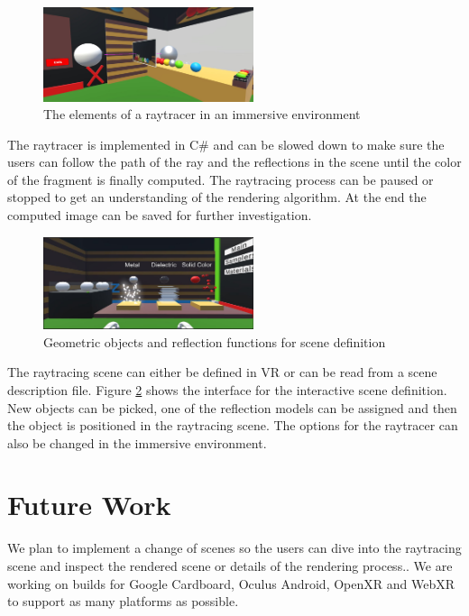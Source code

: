 \documentclass{VRARWorkshop}
\begin{document}
\begin{figure}[h!]
    \begin{center}
        \includegraphics[width=0.55\textwidth]{duringProcess}
        \caption{\label{vray:scene} The elements of a raytracer in an immersive environment}
    \end{center}
\end{figure}
The raytracer is implemented in C\# and can be slowed down to make sure the users can follow the path
of the ray and the reflections in the scene until the color of the fragment is finally computed.
The raytracing process can be paused or stopped to get an understanding of the rendering algorithm.
At the end the computed image can be saved for further investigation.

\begin{figure}[h!]
    \begin{center}
        \includegraphics[width=0.55\textwidth]{sphereCreating}
        \caption{\label{vray:materials} Geometric objects and reflection functions for scene definition}
    \end{center}
\end{figure}
The raytracing scene can either be defined in VR or can be read from a scene description file.
Figure \ref{vray:materials} shows the interface for the interactive scene definition.
New objects can be picked, one of the reflection models can be assigned and then the object
is positioned in the raytracing scene.
The options for the raytracer can also be changed in the immersive environment.
%
\section{Future Work}
We plan to implement a change of scenes so the users can dive into the raytracing scene
and inspect the rendered scene or details of the rendering process..
We are working on builds for Google Cardboard, Oculus Android,
OpenXR and WebXR to support as many platforms as possible.
\end{document}
